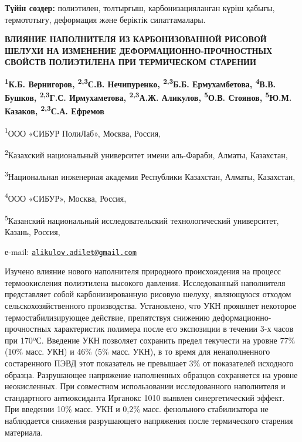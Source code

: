 {\bfseries Түйін сөздер:} полиэтилен, толтырғыш, карбонизацияланған күріш
қабығы, термототығу, деформация және беріктік сипаттамалары.

\begin{articleheader}
{\bfseries ВЛИЯНИЕ НАПОЛНИТЕЛЯ ИЗ КАРБОНИЗОВАННОЙ РИСОВОЙ ШЕЛУХИ НА
ИЗМЕНЕНИЕ ДЕФОРМАЦИОННО-ПРОЧНОСТНЫХ СВОЙСТВ ПОЛИЭТИЛЕНА ПРИ ТЕРМИЧЕСКОМ
СТАРЕНИИ}

{\bfseries \textsuperscript{1}К.Б. Вернигоров, \textsuperscript{2,3}С.В.
Нечипуренко, \textsuperscript{2,3}Б.Б. Ермухамбетова,
\textsuperscript{4}В.В. Бушков, \textsuperscript{2,3}Г.С. Ирмухаметова,
\textsuperscript{2,3}А.Ж. Аликулов\textsuperscript{\envelope },
\textsuperscript{5}О.В. Стоянов, \textsuperscript{5}Ю.М. Казаков,
\textsuperscript{2,3}С.А. Ефремов}
\end{articleheader}

\begin{affiliation}
\textsuperscript{1}ООО «СИБУР ПолиЛаб», Москва, Россия,

\textsuperscript{2}Казахский национальный университет имени аль-Фараби,
Алматы, Казахстан,

\textsuperscript{3}Национальная инженерная академия Республики
Казахстан, Алматы, Казахстан,

\textsuperscript{4}ООО «СИБУР», Москва, Россия,

\textsuperscript{5}Казанский национальный исследовательский
технологический университет, Казань, Россия,

е-mail: \href{mailto:alikulov.adilet@gmail.com}{\nolinkurl{alikulov.adilet@gmail.com}}
\end{affiliation}

Изучено влияние нового наполнителя природного происхождения на процесс
термоокисления полиэтилена высокого давления. Исследованный наполнителя
представляет собой карбонизированную рисовую шелуху, являющуюся отходом
сельскохозяйственного производства. Установлено, что УКН проявляет
некоторое термостабилизирующее действие, препятствуя снижению
деформационно-прочностных характеристик полимера после его экспозиции в
течении 3-х часов при 170ºС. Введение УКН позволяет сохранить предел
текучести на уровне 77\% (10\% масс. УКН) и 46\% (5\% масс. УКН), в то
время для ненаполненного состаренного ПЭВД этот показатель не превышает
3\% от показателей исходного образца. Разрушающее напряжение наполненных
образцов сохраняется на уровне неокисленных. При совместном
использовании исследованного наполнителя и стандартного антиоксиданта
Ирганокс 1010 выявлен синергетический эффект. При введении 10\% масс.
УКН и 0,2\% масс. фенольного стабилизатора не наблюдается снижения
разрушающего напряжения после термического старения материала.

